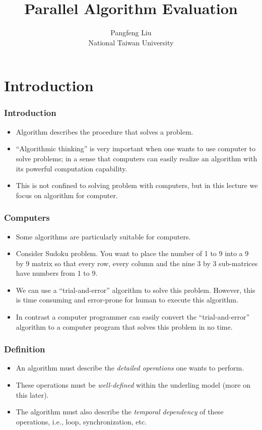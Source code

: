 \documentclass{beamer}
\begin{document}
\begin{CJK}{UTF8}{bsmi}

\title{Parallel Algorithm Evaluation}

\author{Pangfeng Liu \\ National Taiwan University}

\begin{frame}
\titlepage
\end{frame}

\section{Introduction} 

\begin{frame}
\frametitle{Introduction}
\begin{itemize}
\item Algorithm describes the procedure that solves a problem.
\item ``Algorithmic thinking'' is very important when one wants to use
  computer to solve problems; in a sense that computers can easily
  realize an algorithm with its powerful computation capability.
\item This is not confined to solving problem with computers, but in
  this lecture we focus on algorithm for computer.
\end{itemize}
\end{frame}

\begin{frame}
\frametitle{Computers}
\begin{itemize}
\item Some algorithms are particularly suitable for computers.
\item Consider Sudoku problem.  You want to place the number of 1 to 9
  into a 9 by 9 matrix so that every row, every column and the nine 3
  by 3 sub-matrices have numbers from 1 to 9.
\item We can use a ``trial-and-error'' algorithm to solve this
  problem.  However, this is time consuming and error-prone for human
  to execute this algorithm.
\item In contrast a computer programmer can easily convert the
  ``trial-and-error'' algorithm to a computer program that solves this
  problem in no time.
\end{itemize}
\end{frame}

\begin{frame}
\frametitle{Definition}
\begin{itemize}
\item An algorithm must describe the {\em detailed operations} one
  wants to perform.
\item These operations must be {\em well-defined} within the underling
  model (more on this later).
\item The algorithm must also describe the {\em temporal dependency}
  of these operations, i.e., loop, synchronization, etc.
\end{itemize}
\end{frame}


\end{CJK}
\end{document}
